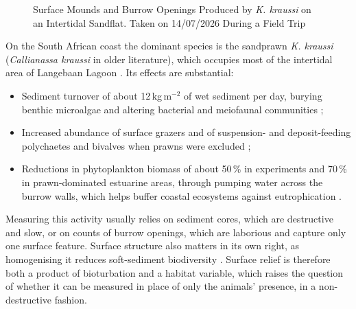 \begin{figure}[htbp]
	\centering
	\caption{Surface Mounds and Burrow Openings Produced by \textit{K. kraussi} on an Intertidal Sandflat. Taken on 14/07/2026 During a Field Trip}
	\label{fig:review.prawn}
\end{figure}

On the South African coast the dominant species is the sandprawn \textit{K. kraussi} (\textit{Callianassa kraussi} in older literature), which occupies most of the intertidal area of Langebaan Lagoon \citep{nelAssessmentAbundanceDistribution2013}. Its effects are substantial:
\begin{itemize}[nosep]
	\item Sediment turnover of about 12\,kg\,m$^{-2}$ of wet sediment per day, burying benthic microalgae and altering bacterial and meiofaunal communities \citep{branchImpactSandPrawn1987};
	
	\item Increased abundance of surface grazers and of suspension- and deposit-feeding polychaetes and bivalves when prawns were excluded \citep{pillayExperimentalEvidenceEffects2007};
	
	\item Reductions in phytoplankton biomass of about 50\,\% in experiments and 70\,\% in prawn-dominated estuarine areas, through pumping water across the burrow walls, which helps buffer coastal ecosystems against eutrophication \citep{venterWaterFiltrationBurrowing2020}.
\end{itemize}

Measuring this activity usually relies on sediment cores, which are destructive and slow, or on counts of burrow openings, which are laborious and capture only one surface feature. Surface structure also matters in its own right, as homogenising it reduces soft-sediment biodiversity \citep{thrushFishingDisturbanceMarine2001}. Surface relief is therefore both a product of bioturbation and a habitat variable, which raises the question of whether it can be measured in place of only the animals' presence, in a non-destructive fashion.

